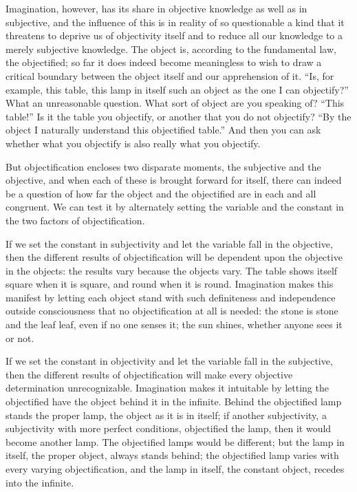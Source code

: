 \documentclass[12pt]{book}
\begin{document}
Imagination, however, has its share in objective knowledge as well as in
subjective, and the influence of this is in reality of so questionable a kind
that it threatens to deprive us of objectivity itself and to reduce all our
knowledge to a merely subjective knowledge. The object is, according to the
fundamental law, the objectified; so far it does indeed become meaningless to
wish to draw a critical boundary between the object itself and our apprehension
of it. ``Is, for example, this table, this lamp in itself such an object as the
one I can objectify?'' What an unreasonable question. What sort of object are
you speaking of? ``This table!'' Is it the table you objectify, or another that
you do not objectify? ``By the object I naturally understand this objectified
table.'' And then you can ask whether what you objectify is also really what you
objectify.

But objectification encloses two disparate moments, the subjective and the
objective, and when each of these is brought forward for itself, there can
indeed be a question of how far the object and the objectified are in each and
all congruent. We can test it by alternately setting the variable and the
constant in the two factors of objectification.

If we set the constant in subjectivity and let the variable fall in the
objective, then the different results of objectification will be dependent upon
the objective in the objects: the results vary because the objects vary. The
table shows itself square when it is square, and round when it is round.
Imagination makes this manifest by letting each object stand with such
definiteness and independence outside consciousness that no objectification at
all is needed: the stone is stone and the leaf leaf, even if no one senses it;
the sun shines, whether anyone sees it or not.

If we set the constant in objectivity and let the variable fall in the
subjective, then the different results of objectification will make every
objective determination unrecognizable. Imagination makes it intuitable by
letting the objectified have the object behind it in the infinite. Behind the
objectified lamp stands the proper lamp, the object as it is in itself; if
another subjectivity, a subjectivity with more perfect conditions, objectified
the lamp, then it would become another lamp. The objectified lamps would be
different; but the lamp in itself, the proper object, always stands behind; the
objectified lamp varies with every varying objectification, and the lamp in
itself, the constant object, recedes into the infinite.
\end{document}
